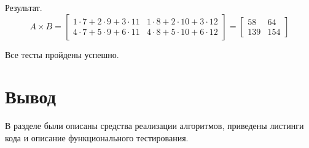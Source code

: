 Результат.
\[
A \times B = \begin{bmatrix} 1 \cdot 7 + 2 \cdot 9 + 3 \cdot 11 & 1 \cdot 8 + 2 \cdot 10 + 3 \cdot 12 \\ 4 \cdot 7 + 5 \cdot 9 + 6 \cdot 11 & 4 \cdot 8 + 5 \cdot 10 + 6 \cdot 12 \end{bmatrix} = \begin{bmatrix} 58 & 64 \\ 139 & 154 \end{bmatrix}
\]

Все тесты пройдены успешно.

\section*{Вывод}

В разделе были описаны средства реализации алгоритмов, приведены листинги кода и описание функционального тестирования.
